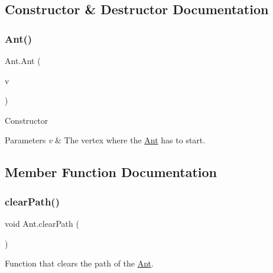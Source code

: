 \subsection{Constructor \& Destructor Documentation}
\mbox{\label{classAnt_a80dccc0945f0093247a6eade6ddc9d15}} 
\subsubsection{\texorpdfstring{Ant()}{Ant()}}
{\footnotesize\ttfamily Ant.\+Ant (\begin{DoxyParamCaption}\item[{\hyperlink{classVertexNode}{Vertex\+Node}}]{v }\end{DoxyParamCaption})\hspace{0.3cm}{\ttfamily [inline]}}



Constructor 


\begin{DoxyParams}{Parameters}
{\em v} & The vertex where the \hyperlink{classAnt}{Ant} has to start.\\
\hline
\end{DoxyParams}


\subsection{Member Function Documentation}
\mbox{\label{classAnt_a4797a8a8f9555b6cb7043692120081d4}} 
\subsubsection{\texorpdfstring{clear\+Path()}{clearPath()}}
{\footnotesize\ttfamily void Ant.\+clear\+Path (\begin{DoxyParamCaption}{ }\end{DoxyParamCaption})\hspace{0.3cm}{\ttfamily [inline]}}



Function that clears the path of the \hyperlink{classAnt}{Ant}. 

\mbox{\label{classAnt_a60c03789bb0cb0190595b64f455c8e31}} 
